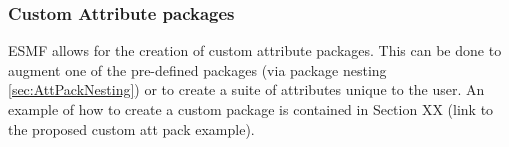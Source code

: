 \vspace{.20in}




\subsubsection{Custom Attribute packages}
\label{sec:CustomAttPacks}

ESMF allows for the creation of custom attribute packages. This can be done to augment one of the pre-defined packages (via package nesting \ref{sec:AttPackNesting}) or to create a suite of 
attributes unique to the user. An example of how to create a custom package is contained in Section XX (link to the proposed custom att pack example).
